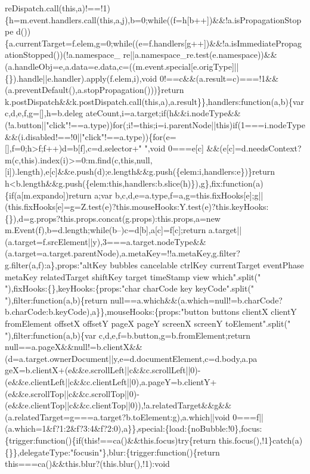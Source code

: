 \begin{DoxyCode}
{      reDispatch.call(this,a)!==!1)\{h=m.event.handlers.call(this,a,j),b=0;while((f=h[b++])&&!a.isPropagationStoppe
      d())\{a.currentTarget=f.elem,g=0;while((e=f.handlers[g++])&&!a.isImmediatePropagationStopped())(!a.namespace\_
      re||a.namespace\_re.test(e.namespace))&&(a.handleObj=e,a.data=e.data,c=((m.event.special[e.origType]||\{\}).handle||e.handler).apply(f.elem,i),void
       0!==c&&(a.result=c)===!1&&(a.preventDefault(),a.stopPropagation()))\}return k.postDispatch&&k.postDispatch.call(this,a),a.result\}\},handlers:function(a,b)\{var
       c,d,e,f,g=[],h=b.deleg
      ateCount,i=a.target;if(h&&i.nodeType&&(!a.button||"click"!==a.type))for(;i!=this;i=i.parentNode||this)if(1===i.nodeType&&(i.disabled!==!0||"click"!==a.type))\{for(e=[],f=0;h>f;f++)d=b[f],c=d.selector+" ",void
       0===e[c]
      &&(e[c]=d.needsContext?m(c,this).index(i)>=0:m.find(c,this,null,[i]).length),e[c]&&e.push(d);e.length&&g.push(\{elem:i,handlers:e\})\}return
       h<b.length&&g.push(\{elem:this,handlers:b.slice(h)\}),g\},fix:function(a)\{if(a[m.expando])return a;var
       b,c,d,e=a.type,f=a,g=this.fixHooks[e];g||(this.fixHooks[e]=g=Z.test(e)?this.mouseHooks:Y.test(e)?this.keyHooks:\{\}),d=g.props?this.props.concat(g.props):this.props,a=new
       m.Event(f),b=d.length;while(b--)c=d[b],a[c]=f[c];return
       a.target||(a.target=f.srcElement||y),3===a.target.nodeType&&(a.target=a.target.parentNode),a.metaKey=!!a.metaKey,g.filter?g.filter(a,f):a\},props:"altKey bubbles cancelable ctrlKey
       currentTarget eventPhase metaKey relatedTarget shiftKey target timeStamp view which".split("
       "),fixHooks:\{\},keyHooks:\{props:"char charCode key keyCode".split(" "),filter:function(a,b)\{return
       null==a.which&&(a.which=null!=b.charCode?b.charCode:b.keyCode),a\}\},mouseHooks:\{props:"button buttons clientX clientY fromElement offsetX
       offsetY pageX pageY screenX screenY toElement".split(" "),filter:function(a,b)\{var
       c,d,e,f=b.button,g=b.fromElement;return
       null==a.pageX&&null!=b.clientX&&(d=a.target.ownerDocument||y,e=d.documentElement,c=d.body,a.pa
      geX=b.clientX+(e&&e.scrollLeft||c&&c.scrollLeft||0)-(e&&e.clientLeft||c&&c.clientLeft||0),a.pageY=b.clientY+
      (e&&e.scrollTop||c&&c.scrollTop||0)-(e&&e.clientTop||c&&c.clientTop||0)),!a.relatedTarget&&g&&(a.relatedTarget=g===a.target?b.toElement:g),a.which||void
       0===f||(a.which=1&f?1:2&f?3:4&f?2:0),a\}\},special:\{load:\{noBubble:!0\},focus:\{trigger:function()\{if(this!==ca()&&this.focus)try\{return
       this.focus(),!1\}catch(a)\{\}\},delegateType:"focusin"\},blur:\{trigger:function()\{return this===ca()&&this.blur?(this.blur(),!1):void
}
\end{DoxyCode}
